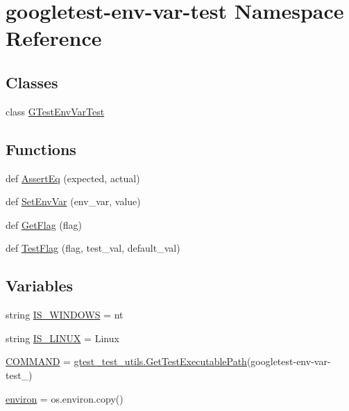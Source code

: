 \hypertarget{namespacegoogletest-env-var-test}{}\section{googletest-\/env-\/var-\/test Namespace Reference}
\label{namespacegoogletest-env-var-test}
\subsection*{Classes}
\begin{DoxyCompactItemize}
\item 
class \mbox{\hyperlink{classgoogletest-env-var-test_1_1GTestEnvVarTest}{G\+Test\+Env\+Var\+Test}}
\end{DoxyCompactItemize}
\subsection*{Functions}
\begin{DoxyCompactItemize}
\item 
def \mbox{\hyperlink{namespacegoogletest-env-var-test_a1dc4462bd3778a92f77f63296bb2a805}{Assert\+Eq}} (expected, actual)
\item 
def \mbox{\hyperlink{namespacegoogletest-env-var-test_a4445af183e70fbd62bf4903ec7447fe6}{Set\+Env\+Var}} (env\+\_\+var, value)
\item 
def \mbox{\hyperlink{namespacegoogletest-env-var-test_a5e599696d970929ff7836e5329e1350f}{Get\+Flag}} (flag)
\item 
def \mbox{\hyperlink{namespacegoogletest-env-var-test_a7b8631f31d258198990b9a6004faa8a7}{Test\+Flag}} (flag, test\+\_\+val, default\+\_\+val)
\end{DoxyCompactItemize}
\subsection*{Variables}
\begin{DoxyCompactItemize}
\item 
string \mbox{\hyperlink{namespacegoogletest-env-var-test_ae045d8de4820c83223f27ff1c2699fc7}{I\+S\+\_\+\+W\+I\+N\+D\+O\+WS}} = \textquotesingle{}nt\textquotesingle{}
\item 
string \mbox{\hyperlink{namespacegoogletest-env-var-test_a55c1ed746133ca7a86a9d5c19e6cc05c}{I\+S\+\_\+\+L\+I\+N\+UX}} = \textquotesingle{}Linux\textquotesingle{}
\item 
\mbox{\hyperlink{namespacegoogletest-env-var-test_a1973327f302e133104ae3ad3eecf17f3}{C\+O\+M\+M\+A\+ND}} = \mbox{\hyperlink{namespacegtest__test__utils_a89ed3717984a80ffbb7a9c92f71b86a2}{gtest\+\_\+test\+\_\+utils.\+Get\+Test\+Executable\+Path}}(\textquotesingle{}googletest-\/env-\/var-\/test\+\_\+\textquotesingle{})
\item 
\mbox{\hyperlink{namespacegoogletest-env-var-test_ade23d144de09227d3ee09500bddcffd2}{environ}} = os.\+environ.\+copy()
\end{DoxyCompactItemize}


